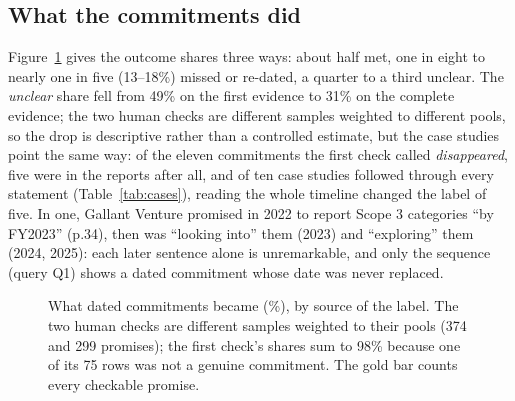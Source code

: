 \documentclass[11pt]{article}
\begin{document}
\subsection{What the commitments did}
\label{sec:rq2-outcomes}
\label{sec:rq2-cases}
Figure~\ref{fig:outcomes} gives the outcome shares three ways: about half met, one in eight to nearly one in five (13--18\%) missed or re-dated, a quarter to a third unclear. The \emph{unclear} share fell from 49\% on the first evidence to 31\% on the complete evidence; the two human checks are different samples weighted to different pools, so the drop is descriptive rather than a controlled estimate, but the case studies point the same way: of the eleven commitments the first check called \emph{disappeared}, five were in the reports after all, and of ten case studies followed through every statement (Table~\ref{tab:cases}), reading the whole timeline changed the label of five. In one, Gallant Venture promised in 2022 to report Scope 3 categories ``by FY2023'' (p.34), then was ``looking into'' them (2023) and ``exploring'' them (2024, 2025): each later sentence alone is unremarkable, and only the sequence (query Q1) shows a dated commitment whose date was never replaced.


\begin{figure}[t]
\centering
{}
\caption{What dated commitments became (\%), by source of the label. The two human checks are different samples weighted to their pools (374 and 299 promises); the first check's shares sum to 98\% because one of its 75 rows was not a genuine commitment. The gold bar counts every checkable promise.}
\label{fig:outcomes}
\end{figure}
\end{document}

